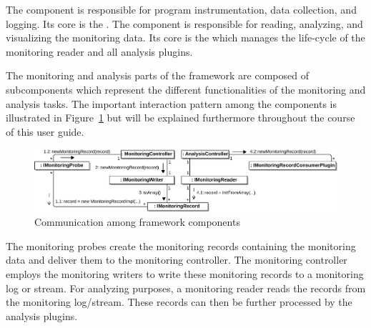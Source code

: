\noindent The \KiekerMonitoringPart{} component is responsible for program instrumentation, data collection, and logging. Its core is the . %
%
The component \KiekerAnalysisPart{} is responsible for reading, analyzing, and visualizing the monitoring data. Its core is the  which manages the life-cycle of the monitoring reader and all analysis plugins.

The monitoring and analysis parts of the \Kieker{} framework are composed of subcomponents which represent the different functionalities of the monitoring and analysis tasks. The important interaction pattern among the components is illustrated in Figure~\ref{fig:KiekerCommunicationDiagram} but will be explained furthermore throughout the course of this user guide.

\vspace{1cm}

\begin{figure}[H]\centering
\includegraphics[width=1\textwidth]{images/kiekerCommunications-revisedReArranged-woMonitoringLog-bw-newNames}
\caption{Communication among \Kieker{} framework components}
\label{fig:KiekerCommunicationDiagram}
\end{figure}

\vspace{1cm}

\noindent The monitoring probes create the monitoring records containing the %
monitoring data and deliver them to the monitoring controller. %
The monitoring controller employs the monitoring writers to write these %
monitoring records to a monitoring log or stream. %
For analyzing purposes, a monitoring reader reads the records from the monitoring log/stream. %
These records can then be further processed by the analysis plugins.


